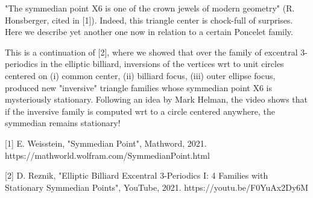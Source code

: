"The symmedian point X6 is one of the crown jewels of modern geometry" (R. Honsberger, cited in [1]). Indeed, this triangle center is chock-full of surprises. Here we describe yet another one now in relation to a certain Poncelet family.

This is a continuation of [2], where we showed that over the family of excentral 3-periodics in the elliptic billiard, inversions of the vertices wrt to unit circles centered on (i) common center, (ii) billiard focus, (iii) outer ellipse focus, produced new "inversive" triangle families whose symmedian point X6 is mysteriously stationary. Following an idea by Mark Helman, the video shows that if the inversive family is computed wrt to a circle centered anywhere, the symmedian remains stationary!

[1] E. Weisstein, "Symmedian Point", Mathword, 2021. https://mathworld.wolfram.com/SymmedianPoint.html

[2] D. Reznik, "Elliptic Billiard Excentral 3-Periodics I: 4 Families with Stationary Symmedian Points", YouTube, 2021. https://youtu.be/F0YuAx2Dy6M